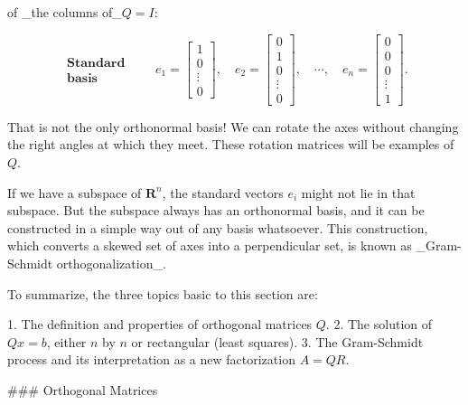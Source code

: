 of _the columns of_\(Q=I\):

\[\begin{array}{c}\textbf{Standard}\\ \textbf{basis}\end{array}\qquad e_{1}=\begin{bmatrix}1\\ 0\\ \vdots\\ 0\end{bmatrix},\quad e_{2}=\begin{bmatrix}0\\ 1\\ 0\\ \vdots\\ 0\end{bmatrix},\quad\cdots,\quad e_{n}=\begin{bmatrix}0\\ 0\\ 0\\ \vdots\\ 1\end{bmatrix}.\]

That is not the only orthonormal basis! We can rotate the axes without changing the right angles at which they meet. These rotation matrices will be examples of \(Q\).

If we have a subspace of \(\mathbf{R}^{n}\), the standard vectors \(e_{i}\) might not lie in that subspace. But the subspace always has an orthonormal basis, and it can be constructed in a simple way out of any basis whatsoever. This construction, which converts a skewed set of axes into a perpendicular set, is known as _Gram-Schmidt orthogonalization_.

To summarize, the three topics basic to this section are:

1. The definition and properties of orthogonal matrices \(Q\).
2. The solution of \(Qx=b\), either \(n\) by \(n\) or rectangular (least squares).
3. The Gram-Schmidt process and its interpretation as a new factorization \(A=QR\).

### Orthogonal Matrices

